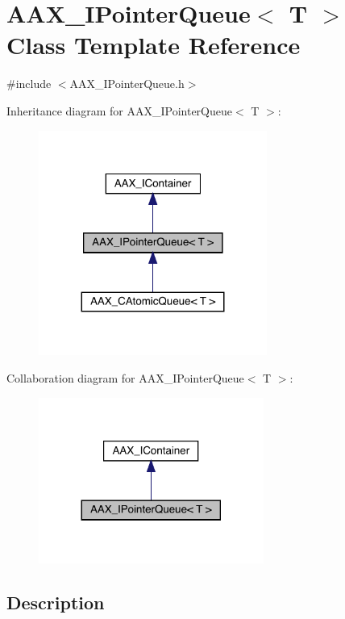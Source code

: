 \hypertarget{a01861}{}\section{A\+A\+X\+\_\+\+I\+Pointer\+Queue$<$ T $>$ Class Template Reference}
\label{a01861}


{\ttfamily \#include $<$A\+A\+X\+\_\+\+I\+Pointer\+Queue.\+h$>$}



Inheritance diagram for A\+A\+X\+\_\+\+I\+Pointer\+Queue$<$ T $>$\+:
\nopagebreak
\begin{figure}[H]
\begin{center}
\leavevmode
\includegraphics[width=212pt]{a01860}
\end{center}
\end{figure}


Collaboration diagram for A\+A\+X\+\_\+\+I\+Pointer\+Queue$<$ T $>$\+:
\nopagebreak
\begin{figure}[H]
\begin{center}
\leavevmode
\includegraphics[width=209pt]{a01859}
\end{center}
\end{figure}


\subsection{Description}
